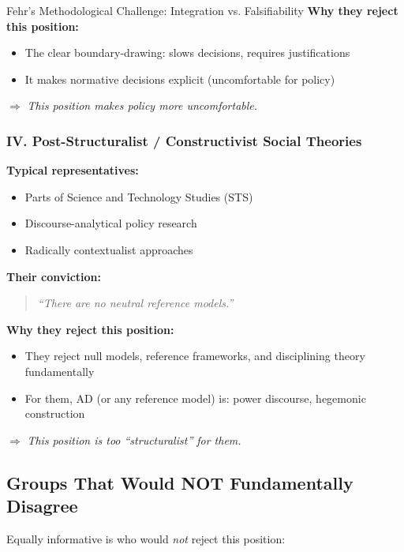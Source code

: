 \begin{chapter}{Fehr's Methodological Challenge: Integration vs. Falsifiability}
\textbf{Why they reject this position:}
\begin{itemize}[noitemsep]
    \item The clear boundary-drawing: slows decisions, requires justifications
    \item It makes normative decisions explicit (uncomfortable for policy)
\end{itemize}

$\Rightarrow$ \textit{This position makes policy more uncomfortable.}

\subsubsection{IV. Post-Structuralist / Constructivist Social Theories}

\textbf{Typical representatives:}
\begin{itemize}[noitemsep]
    \item Parts of Science and Technology Studies (STS)
    \item Discourse-analytical policy research
    \item Radically contextualist approaches
\end{itemize}

\textbf{Their conviction:}
\begin{quote}
\textit{``There are no neutral reference models.''}
\end{quote}

\textbf{Why they reject this position:}
\begin{itemize}[noitemsep]
    \item They reject null models, reference frameworks, and disciplining theory fundamentally
    \item For them, AD (or any reference model) is: power discourse, hegemonic construction
\end{itemize}

$\Rightarrow$ \textit{This position is too ``structuralist'' for them.}

\subsection{Groups That Would NOT Fundamentally Disagree}

Equally informative is who would \textit{not} reject this position:


\end{chapter}
